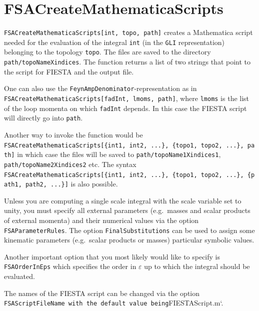 \documentclass[../FeynHelpersManual.tex]{subfiles}
\begin{document}
\hypertarget{fsacreatemathematicascripts}{
\section{FSACreateMathematicaScripts}\label{fsacreatemathematicascripts}}

\texttt{FSACreateMathematicaScripts[\allowbreak{}int,\ \allowbreak{}topo,\ \allowbreak{}path]}
creates a Mathematica script needed for the evaluation of the integral
\texttt{int} (in the \texttt{GLI} representation) belonging to the
topology \texttt{topo}. The files are saved to the directory
\texttt{path/topoNameXindices}. The function returns a list of two
strings that point to the script for FIESTA and the output file.

One can also use the \texttt{FeynAmpDenominator}-representation as in
\texttt{FSACreateMathematicaScripts[\allowbreak{}fadInt,\ \allowbreak{}lmoms,\ \allowbreak{}path]},
where \texttt{lmoms} is the list of the loop momenta on which
\texttt{fadInt} depends. In this case the FIESTA script will directly go
into \texttt{path}.

Another way to invoke the function would be
\texttt{FSACreateMathematicaScripts[\allowbreak{}\{\allowbreak{}int1,\ \allowbreak{}int2,\ \allowbreak{}...\},\ \allowbreak{}\{\allowbreak{}topo1,\ \allowbreak{}topo2,\ \allowbreak{}...\},\ \allowbreak{}path]}
in which case the files will be saved to
\texttt{path/topoName1Xindices1}, \texttt{path/topoName2Xindices2} etc.
The syntax
\texttt{FSACreateMathematicaScripts[\allowbreak{}\{\allowbreak{}int1,\ \allowbreak{}int2,\ \allowbreak{}...\},\ \allowbreak{}\{\allowbreak{}topo1,\ \allowbreak{}topo2,\ \allowbreak{}...\},\ \allowbreak{}\{\allowbreak{}path1,\ \allowbreak{}path2,\ \allowbreak{}...\}]}
is also possible.

Unless you are computing a single scale integral with the scale variable
set to unity, you must specify all external parameters (e.g.~masses and
scalar products of external momenta) and their numerical values via the
option \texttt{FSAParameterRules}. The option
\texttt{FinalSubstitutions} can be used to assign some kinematic
parameters (e.g.~scalar products or masses) particular symbolic values.

Another important option that you most likely would like to specify is
\texttt{FSAOrderInEps} which specifies the order in \(\varepsilon\) up
to which the integral should be evaluated.

The names of the FIESTA script can be changed via the option
\texttt{FSAScriptFileName with the default value being}FIESTAScript.m`.
\end{document}

